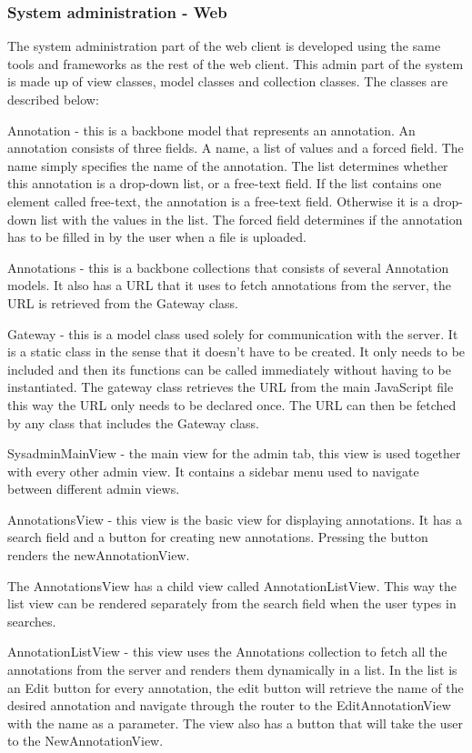 \subsubsection{System administration - Web}
The system administration part of the web client is developed using the same tools and frameworks as the rest of the web client.
This admin part of the system is made up of view classes, model classes and collection classes. The classes are described below:

Annotation - this is a backbone model that represents an annotation. An annotation consists of three fields. A name, a list of values and a forced field. The name simply specifies the name of the annotation. The list determines whether this annotation is a drop-down list, or a free-text field. If the list contains one element called free-text, the annotation is a free-text field. Otherwise it is a drop-down list with the values in the list. The forced field determines if
the annotation has to be filled in by the user when a file is uploaded.

Annotations - this is a backbone collections that consists of several Annotation models. It also has a URL that it uses to fetch annotations from the server, the URL is retrieved from the Gateway class. 

Gateway - this is a model class used solely for communication with the server. It is a static class in the sense that it doesn't have to be created. It only needs to be included and then its functions can be called immediately without having to be instantiated. The gateway class retrieves the URL from the main JavaScript file this way the URL only needs to be declared once. The URL can then be fetched by any class that includes the Gateway class.

SysadminMainView - the main view for the admin tab, this view is used together with every other admin view. It contains a sidebar menu used to navigate between different admin views.

AnnotationsView - this view is the basic view for displaying annotations. It has a search field and a button for creating new annotations. Pressing the button renders the newAnnotationView. 

The AnnotationsView has a child view called AnnotationListView. This way the list view can be rendered separately from the search field when the user types in searches. 

AnnotationListView - this view uses the Annotations collection to fetch all the annotations from the server and renders them dynamically in a list.
In the list is an Edit button for every annotation, the edit button will retrieve the name of the desired annotation and navigate through the router to the EditAnnotationView with the name as a parameter.
The view also has a button that will take the user to the NewAnnotationView.

